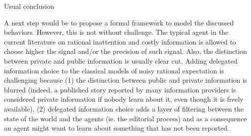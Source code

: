 Usual conclusion

A next step would be to propose a formal framework to model the discussed behaviors. However, this is not without challenge. The typical agent in the current literature on rational inattention and costly information is allowed to choose higher the signal and/or the precision of such signal. Also, the distinction between private and public information is usually clear cut. Adding delegated information choice to the classical models of noisy rational expectation is challenging because (1) the distinction between public and private information is blurred (indeed, a published story reported by many information providers is considered private information if nobody learn about it, even though it is freely available), (2) delegated information choice adds a layer of filtering between the state of the world and the agents (ie. the editorial process) and as a consequence an agent might want to learn about something that has not been reported. 